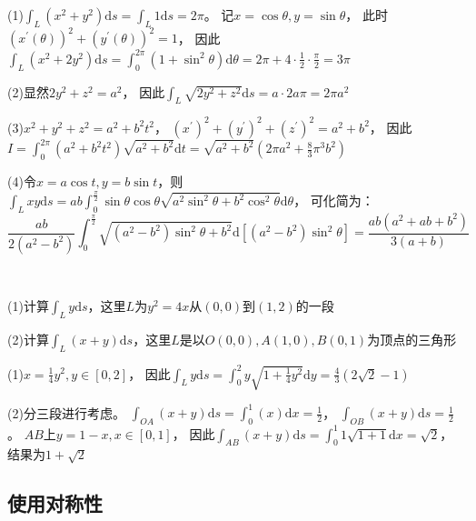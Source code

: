 \begin{solution}
  (1)$\int_L(x^2 + y^2)\mathrm{d} s = \int _L 1\mathrm{d} s = 2\pi$。
  记$x = \cos \theta, y = \sin \theta$，
  此时$(x^{\prime}(\theta))^2 + (y^{\prime}(\theta))^2 = 1$，
  因此$\int_L(x^2 + 2y^2)\mathrm{d} s = \int_0^{2\pi}(1 + \sin^2 \theta) \mathrm{d} \theta = 2\pi + 4 \cdot \frac{1}{2} \cdot \frac{\pi}{2} = 3\pi$

  (2)显然$2y^2 + z^2 = a^2$，
  因此$\int_L \sqrt{2y^2 + z^2}\mathrm{d} s = a \cdot 2a\pi = 2\pi a^2$

  (3)$x^2 + y^2 + z^2 = a^2 + b^2t^2$，
  $(x^{\prime})^2 + (y^{\prime})^2 + (z^{\prime})^2 = a^2 + b^2$，
  因此$I = \int_0^{2\pi}(a^2 + b^2t^2)\sqrt{a^2 + b^2}\mathrm{d} t = \sqrt{a^2 + b^2} (2\pi a^2 + \frac{8}{3}\pi^3 b^2)$

  (4)令$x = a \cos t, y = b \sin t$，则
  $\int_L xy \mathrm{d} s = ab \int_0^{\frac{\pi}{2}} \sin \theta \cos \theta \sqrt{a^2 \sin^2 \theta + b^2 \cos^2 \theta}\mathrm{d} \theta$，
  可化简为：
  \begin{equation*}
    \frac{ab}{2(a^2 - b^2)} \int_0^{\frac{\pi}{2}} \sqrt{(a^2 - b^2)\sin^2 \theta + b^2} \mathrm{d} [(a^2 - b^2)\sin^2 \theta] = \frac{ab(a^2 + ab + b^2)}{3(a+b)}
  \end{equation*}
\end{solution}

~

\begin{exercise}[折线形式]
  (1)计算$\int_L y \mathrm{d} s$，这里$L$为$y^2 = 4x$从$(0,0)$到$(1,2)$的一段
  
  (2)计算$\int_L (x+y) \mathrm{d} s$，这里$L$是以$O(0,0),A(1,0), B(0,1)$为顶点的三角形
\end{exercise}

\begin{solution}
  (1)$x = \frac{1}{4}y^2, y \in [0,2]$，
  因此$\int_L y \mathrm{d} s = \int_0^2 y \sqrt{1 + \frac{1}{4}y^2}\mathrm{d} y = \frac{4}{3}(2 \sqrt{2} - 1)$
  
  (2)分三段进行考虑。
  $\int_{OA}(x+y)\mathrm{d} s = \int_0^1 (x)\mathrm{d} x = \frac{1}{2}$，
  $\int_{OB}(x+y)\mathrm{d} s = \frac{1}{2}$。
  $AB$上$y = 1 - x, x \in [0,1]$，
  因此$\int_{AB}(x+y)\mathrm{d} s = \int_0^1 1 \sqrt{1 + 1}\mathrm{d} x = \sqrt{2}$，
  结果为$1 + \sqrt{2}$
\end{solution}

\subsection{使用对称性}

